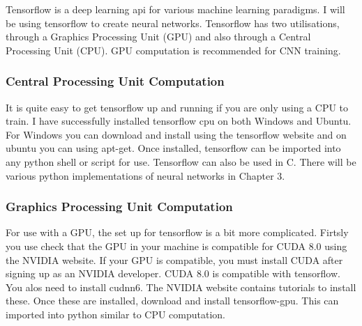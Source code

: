 Tensorflow is a deep learning api for various machine learning paradigms. I will
be using tensorflow to create neural networks.
Tensorflow has two utilisations, through a Graphics Processing Unit (GPU) and
also through a Central Processing Unit (CPU).
GPU computation is recommended for CNN training. 

\subsubsection*{Central Processing Unit Computation}
It is quite easy to get tensorflow up and running if you are only using a CPU to
train. I have successfully installed tensorflow cpu on both Windows and Ubuntu.
For Windows you can download and install using the tensorflow website and on ubuntu you can
using apt-get. Once installed, tensorflow can be imported into any python shell
or script for use. Tensorflow can also be used in C. There will be various
python implementations of neural networks in Chapter 3.

\subsubsection*{Graphics Processing Unit Computation}
For use with a GPU, the set up for tensorflow is a bit more complicated. Firtsly
you use check that the GPU in your machine is compatible for CUDA 8.0 using the
NVIDIA website. If your GPU is compatible, you must install CUDA after signing
up as an NVIDIA developer. CUDA 8.0 is compatible with tensorflow. You alos need
to install cudnn6. The NVIDIA website contains tutorials to install these. Once
these are installed, download and install tensorflow-gpu. This can imported into
python similar to CPU computation.
